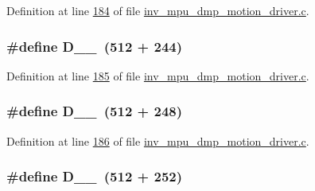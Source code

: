 Definition at line \hyperlink{inv__mpu__dmp__motion__driver_8c_source_l00184}{184} of file \hyperlink{inv__mpu__dmp__motion__driver_8c_source}{inv\+\_\+mpu\+\_\+dmp\+\_\+motion\+\_\+driver.\+c}.

\subsubsection[{\texorpdfstring{D\+\_\+2\+\_\+244}{D_2_244}}]{\setlength{\rightskip}{0pt plus 5cm}\#define D\+\_\+\_~(512 + 244)}\hypertarget{group___d_r_i_v_e_r_s_gaf53e9ad71a55861be572b74497681bb1}{}\label{group___d_r_i_v_e_r_s_gaf53e9ad71a55861be572b74497681bb1}


Definition at line \hyperlink{inv__mpu__dmp__motion__driver_8c_source_l00185}{185} of file \hyperlink{inv__mpu__dmp__motion__driver_8c_source}{inv\+\_\+mpu\+\_\+dmp\+\_\+motion\+\_\+driver.\+c}.

\subsubsection[{\texorpdfstring{D\+\_\+2\+\_\+248}{D_2_248}}]{\setlength{\rightskip}{0pt plus 5cm}\#define D\+\_\+\_~(512 + 248)}\hypertarget{group___d_r_i_v_e_r_s_gab8953d8cd2c2dbeea3cc33ee50d0e3e1}{}\label{group___d_r_i_v_e_r_s_gab8953d8cd2c2dbeea3cc33ee50d0e3e1}


Definition at line \hyperlink{inv__mpu__dmp__motion__driver_8c_source_l00186}{186} of file \hyperlink{inv__mpu__dmp__motion__driver_8c_source}{inv\+\_\+mpu\+\_\+dmp\+\_\+motion\+\_\+driver.\+c}.

\subsubsection[{\texorpdfstring{D\+\_\+2\+\_\+252}{D_2_252}}]{\setlength{\rightskip}{0pt plus 5cm}\#define D\+\_\+\_~(512 + 252)}\hypertarget{group___d_r_i_v_e_r_s_ga94327b4d894185063c5104a02d9714ee}{}\label{group___d_r_i_v_e_r_s_ga94327b4d894185063c5104a02d9714ee}


